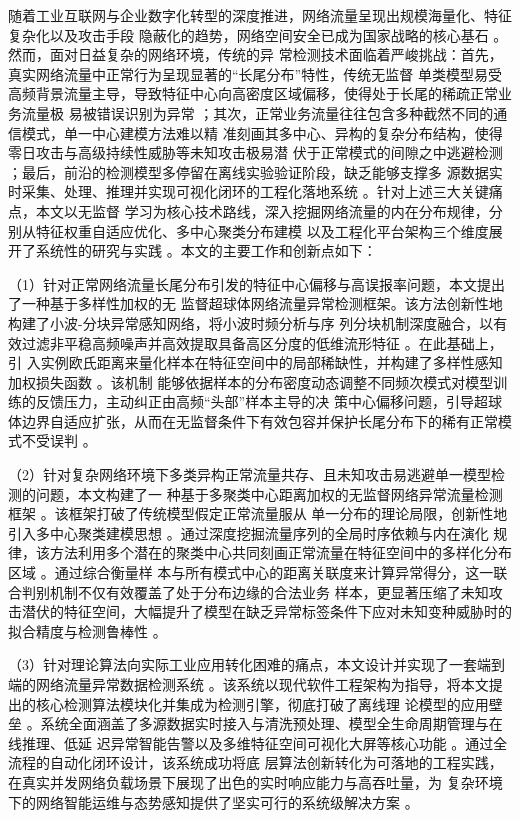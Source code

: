 \begin{cabstract}
    \thispagestyle{plain}
    随着工业互联网与企业数字化转型的深度推进，网络流量呈现出规模海量化、特征复杂化以及攻击手段
    隐蔽化的趋势，网络空间安全已成为国家战略的核心基石 。然而，面对日益复杂的网络环境，传统的异
    常检测技术面临着严峻挑战：首先，真实网络流量中正常行为呈现显著的“长尾分布”特性，传统无监督
    单类模型易受高频背景流量主导，导致特征中心向高密度区域偏移，使得处于长尾的稀疏正常业务流量极
    易被错误识别为异常 ；其次，正常业务流量往往包含多种截然不同的通信模式，单一中心建模方法难以精
    准刻画其多中心、异构的复杂分布结构，使得零日攻击与高级持续性威胁等未知攻击极易潜
    伏于正常模式的间隙之中逃避检测 ；最后，前沿的检测模型多停留在离线实验验证阶段，缺乏能够支撑多
    源数据实时采集、处理、推理并实现可视化闭环的工程化落地系统 。针对上述三大关键痛点，本文以无监督
    学习为核心技术路线，深入挖掘网络流量的内在分布规律，分别从特征权重自适应优化、多中心聚类分布建模
    以及工程化平台架构三个维度展开了系统性的研究与实践 。本文的主要工作和创新点如下：

    （1）针对正常网络流量长尾分布引发的特征中心偏移与高误报率问题，本文提出了一种基于多样性加权的无
    监督超球体网络流量异常检测框架。该方法创新性地构建了小波-分块异常感知网络，将小波时频分析与序
    列分块机制深度融合，以有效过滤非平稳高频噪声并高效提取具备高区分度的低维流形特征 。在此基础上，引
    入实例欧氏距离来量化样本在特征空间中的局部稀缺性，并构建了多样性感知加权损失函数 。该机制
    能够依据样本的分布密度动态调整不同频次模式对模型训练的反馈压力，主动纠正由高频“头部”样本主导的决
    策中心偏移问题，引导超球体边界自适应扩张，从而在无监督条件下有效包容并保护长尾分布下的稀有正常模
    式不受误判 。

    （2）针对复杂网络环境下多类异构正常流量共存、且未知攻击易逃避单一模型检测的问题，本文构建了一
    种基于多聚类中心距离加权的无监督网络异常流量检测框架 。该框架打破了传统模型假定正常流量服从
    单一分布的理论局限，创新性地引入多中心聚类建模思想 。通过深度挖掘流量序列的全局时序依赖与内在演化
    规律，该方法利用多个潜在的聚类中心共同刻画正常流量在特征空间中的多样化分布区域 。通过综合衡量样
    本与所有模式中心的距离关联度来计算异常得分，这一联合判别机制不仅有效覆盖了处于分布边缘的合法业务
    样本，更显著压缩了未知攻击潜伏的特征空间，大幅提升了模型在缺乏异常标签条件下应对未知变种威胁时的
    拟合精度与检测鲁棒性 。

    （3）针对理论算法向实际工业应用转化困难的痛点，本文设计并实现了一套端到端的网络流量异常数据检测系统
    。该系统以现代软件工程架构为指导，将本文提出的核心检测算法模块化并集成为检测引擎，彻底打破了离线理
    论模型的应用壁垒 。系统全面涵盖了多源数据实时接入与清洗预处理、模型全生命周期管理与在线推理、低延
    迟异常智能告警以及多维特征空间可视化大屏等核心功能 。通过全流程的自动化闭环设计，该系统成功将底
    层算法创新转化为可落地的工程实践，在真实并发网络负载场景下展现了出色的实时响应能力与高吞吐量，为
    复杂环境下的网络智能运维与态势感知提供了坚实可行的系统级解决方案 。
    
\end{cabstract}

